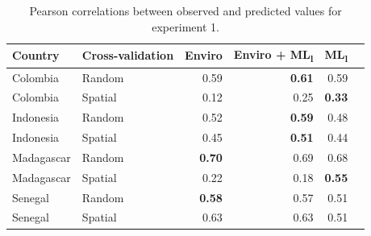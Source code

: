 \documentclass[review]{elsarticle}
\begin{document}
\begin{table}[t!]

\centering
\begin{tabular}{llrrrr}
Country &  Cross-validation & Enviro &  Enviro + ML\textsubscript{l} &  ML\textsubscript{l} \\
\hline 
 Colombia & Random &  0.59 & \textbf{0.61}& 0.59  \\
 Colombia &  Spatial &  0.12 &  0.25&  \textbf{0.33} \\
 Indonesia &  Random &  0.52 &  \textbf{0.59}&  0.48  \\
 Indonesia &  Spatial &  0.45 &  \textbf{0.51}&  0.44  \\
 Madagascar & Random &   \textbf{0.70}& 0.69 &  0.68  \\
 Madagascar &  Spatial &  0.22 & 0.18&  \textbf{0.55} \\
 Senegal &  Random &  \textbf{0.58} & 0.57&  0.51  \\
 Senegal &  Spatial &  0.63 &  0.63&  0.51  \\
\end{tabular}
\caption{Pearson correlations between observed and predicted values for experiment 1. }
\label{t:results}

\end{table}
\end{document}
